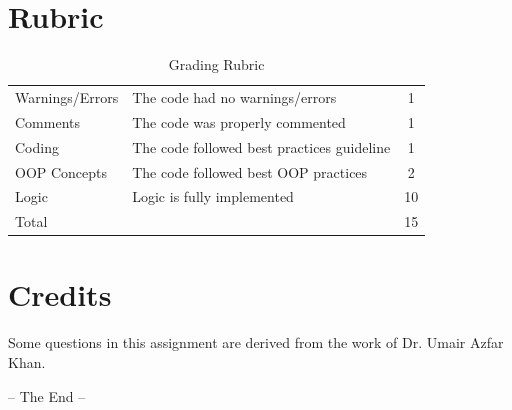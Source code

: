\documentclass[a4paper,12pt]{article}
\begin{document}
		\section{Rubric}
	\begin{table}[h]
		\centering
		\begin{tabular}{llc}
			\toprule
			Warnings/Errors	& The code had no warnings/errors	& 1 \\
			Comments &	The code was properly commented	& 1 \\
			Coding	& The code followed best practices guideline &	1 \\
			OOP Concepts & The code followed best OOP practices & 2 \\
			Logic	& Logic is fully implemented	& 10 \\
			\midrule
			Total & & 15\\
			\bottomrule
		\end{tabular}
		\caption{Grading Rubric}
		\label{Grading}
	\end{table}
	\section{Credits}
		Some questions in this assignment are derived from the work of Dr. Umair Azfar Khan.
	\begin{center}
		-- The End --
	\end{center}
	\newpage
	
	
\end{document}
